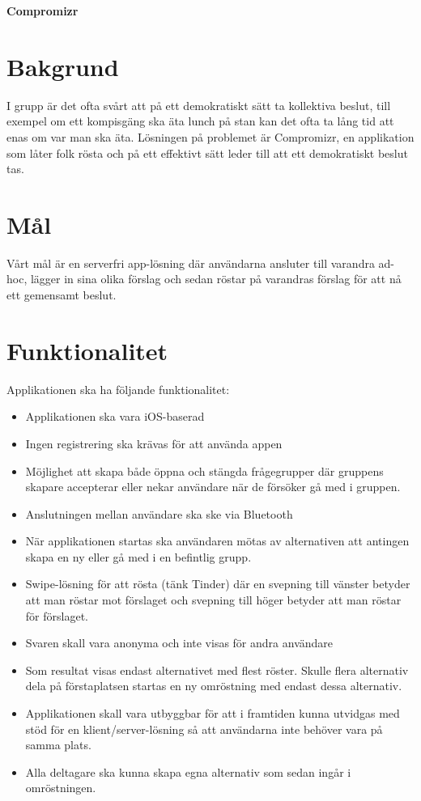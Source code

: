 \documentclass[10pt]{article}
\date{}
\begin{document}

\begin{center}
{\Large
\textbf{Compromizr}
}
\end{center}




\section*{Bakgrund}
\sloppy
\noindent I grupp är det ofta svårt att på ett demokratiskt sätt ta kollektiva beslut, till exempel om ett kompisgäng ska äta lunch på stan kan det ofta ta lång tid att enas om var man ska äta. Lösningen på problemet är Compromizr, en applikation som låter folk rösta och på ett effektivt sätt leder till att ett demokratiskt beslut tas. 

\section*{Mål}
\sloppy
\noindent Vårt mål är en serverfri app-lösning där användarna ansluter till varandra ad-hoc, lägger in sina olika förslag och sedan röstar på varandras förslag för att nå ett gemensamt beslut.

\section*{Funktionalitet}
\sloppy
\noindent Applikationen ska ha följande funktionalitet: 
\begin{itemize}
	\setlength\itemsep{0.1em}
	\item Applikationen ska vara iOS-baserad
	\item Ingen registrering ska krävas för att använda appen
	\item Möjlighet att skapa både öppna och stängda frågegrupper där gruppens skapare accepterar eller nekar användare när de försöker gå med i gruppen.
	\item Anslutningen mellan användare ska ske via Bluetooth
    \item När applikationen startas ska användaren mötas av alternativen att antingen skapa en ny eller gå med i en befintlig grupp.
    \item Swipe-lösning för att rösta (tänk Tinder) där en svepning till vänster betyder att man röstar mot förslaget och svepning till höger betyder att man röstar för förslaget.
    \item Svaren skall vara anonyma och inte visas för andra användare
    \item Som resultat visas endast alternativet med flest röster. Skulle flera alternativ dela på förstaplatsen startas en ny omröstning med endast dessa alternativ. 
    \item Applikationen skall vara utbyggbar för att i framtiden kunna utvidgas med stöd för en klient/server-lösning så att användarna inte behöver vara på samma plats.
    \item Alla deltagare ska kunna skapa egna alternativ som sedan ingår i omröstningen.
\end{itemize}
\end{document}
